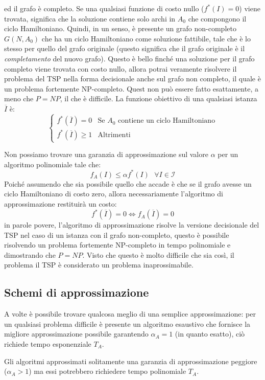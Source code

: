 \documentclass{article}
\begin{document}
ed il grafo è completo. Se una qualsiasi funzione di costo nullo ($f^*(I)=0$) viene trovata, significa che la
soluzione contiene solo archi in $A_0$ che compongono il ciclo Hamiltoniano. Quindi, in un senso, è presente
un grafo non-completo $G(N,A_0)$ che ha un ciclo Hamiltoniano come soluzione fattibile, tale che è lo stesso
per quello del grafo originale (questo significa che il grafo originale è il \textit{completamento} del nuovo
grafo).
Questo è bello finché una soluzione per il grafo completo viene trovata con costo nullo, allora potrai
veramente risolvere il problema del TSP nella forma decisionale anche sul grafo non completo, il quale
è un problema fortemente NP-completo. Quest non può essere fatto esattamente, a meno che $P=NP$, il
che è difficile. La funzione obiettivo di una qualsiasi istanza $\overline{I}$ è:
\[\begin{cases}
        f^*(\overline{I})=0     & \text{Se }A_0\text{ contiene un ciclo Hamiltoniano} \\
        f^*(\overline{I})\geq 1 & \text{Altrimenti}
    \end{cases}
\]

Non possiamo trovare una garanzia di approssimazione sul valore $\alpha$ per un algoritmo
polinomiale tale che:
$$f_A(I)\leq\alpha f^*(I)\text{  }\forall I\in\mathcal{I}$$
Poiché assumendo che sia possibile quello che accade è che se il grafo avesse un ciclo Hamiltoniano
di costo zero, allora necessariamente l'algoritmo di approssimazione restituirà un costo:
$$f^*(\overline{I})=0\Leftrightarrow f_A(\overline{I})=0$$
in parole povere, l'algoritmo di approssimazione risolve la versione decisionale del TSP nel
caso di un istanza con il grafo non-completo, questo è possibile risolvendo un problema
fortemente NP-completo in tempo polinomiale e dimostrando che $P=NP$. Visto che questo è molto
difficile che sia così, il problema il TSP è considerato un problema inaprossimabile.

\subsection{Schemi di approssimazione}
A volte è possibile trovare qualcosa meglio di una semplice approssimazione: per un qualsiasi
problema difficile è presente un algoritmo esaustivo che fornisce la migliore approssimazione
possibile garantendo $\alpha_A=1$ (in quanto esatto), ciò richiede tempo esponenziale $T_A$.

Gli algoritmi approssimati solitamente una garanzia di approssimazione peggiore ($\alpha_A >1$)
ma essi potrebbero richiedere tempo polinomiale $T_A$.
\end{document}
